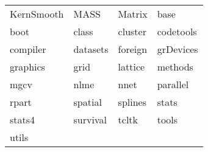 \begin{tabular}{llll} 
KernSmooth & MASS & Matrix & base\\ 
boot & class & cluster & codetools\\ 
compiler & datasets & foreign & grDevices\\ 
graphics & grid & lattice & methods\\ 
mgcv & nlme & nnet & parallel\\ 
rpart & spatial & splines & stats\\ 
stats4 & survival & tcltk & tools\\ 
utils  &   &   \\ 
\end{tabular}
